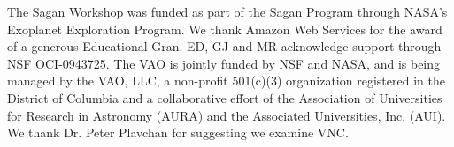\documentclass[11pt,twoside]{article}
\begin{document}
\acknowledgements The Sagan Workshop was funded as part of the Sagan Program through NASA's Exoplanet Exploration Program. We thank Amazon Web Services for the award of a generous Educational Gran. ED, GJ and MR acknowledge support through NSF OCI-0943725. The VAO is jointly funded by NSF and NASA, and is being managed by the VAO, LLC, a non-profit 501(c)(3) organization registered in the District of Columbia and a collaborative effort of the Association of Universities for Research in Astronomy (AURA) and the Associated Universities, Inc. (AUI). We thank Dr. Peter Plavchan for suggesting we examine VNC.

%
\end{document}
